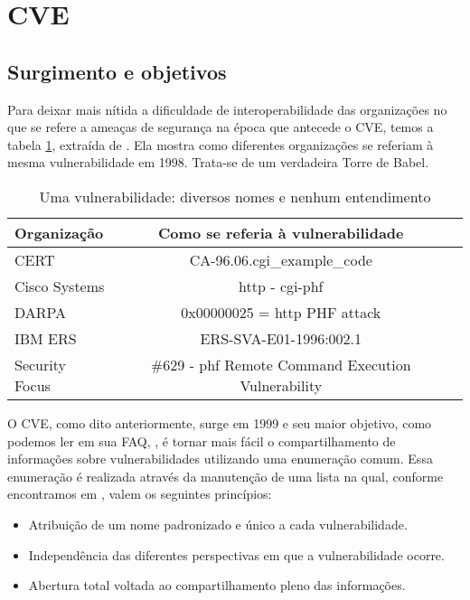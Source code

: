 	\section{CVE}
	\label{sec:cve}

		\subsection{Surgimento e objetivos}
			Para deixar mais nítida a dificuldade de interoperabilidade
			das organizações no que se refere a ameaças de segurança na época
			que antecede o CVE, temos a tabela \ref{tab:torre_babel}, extraída de \cite{Martin2001}.
			Ela	mostra como diferentes organizações se referiam à mesma vulnerabilidade
			em 1998. Trata-se de um verdadeira Torre de Babel.

			\begin{table}
				\begin{tabular}{|l|c|c|}
					\hline
						\textbf{Organização} & \textbf{Como se referia à vulnerabilidade}\\
					\hline
						CERT & CA-96.06.cgi\_example\_code\\
					\hline
						Cisco Systems & http - cgi-phf\\
					\hline
						DARPA & 0x00000025 = http PHF attack\\	
					\hline
						IBM ERS & ERS-SVA-E01-1996:002.1\\	
					\hline
						Security Focus & \#629 - phf Remote Command Execution Vulnerability\\	
					\hline
				\end{tabular}
				\caption{Uma vulnerabilidade: diversos nomes e nenhum entendimento}\label{tab:torre_babel}
			\end{table}
			

			O CVE, como dito anteriormente, surge em 1999 e seu maior objetivo, como podemos
			ler em sua FAQ, \cite{CVE2010}, é tornar mais fácil
			o compartilhamento de informações sobre vulnerabilidades utilizando uma enumeração comum.
			Essa enumeração é realizada através da manutenção de uma lista na qual, conforme
			encontramos em \cite{Santos2004}, valem os seguintes princípios:
			\begin{itemize}
				\item{Atribuição de um nome padronizado e único a cada vulnerabilidade.}
				\item{Independência das diferentes perspectivas em que a vulnerabilidade ocorre.}
				\item{Abertura total voltada ao compartilhamento pleno das informações.}
			\end{itemize}


